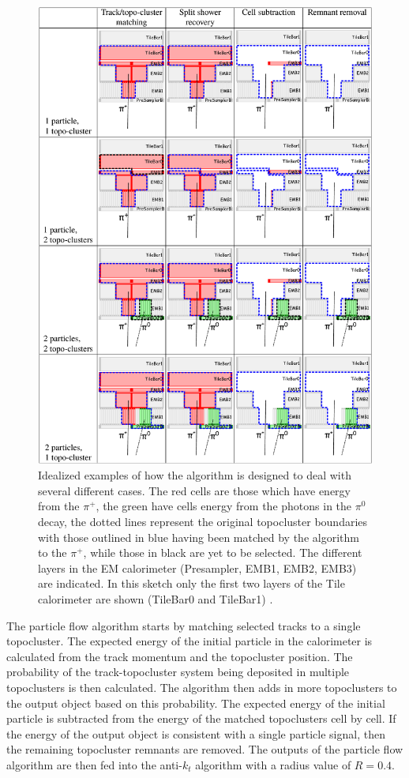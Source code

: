 		\begin{figure}[!ht]
		\centering
		\includegraphics[width=.75\textwidth,keepaspectratio=true]{chapters/chapter5_eventreconnstruction/images/pflow_example.png}
		\caption{\label{fig:pflow-example} Idealized examples of how the algorithm is designed to deal with several different cases. The red cells are those which have energy from the $\pi^{+}$, the green have cells energy from the photons in the $\pi^{0}$  decay, the dotted lines represent the original topocluster boundaries with those outlined in blue having been matched by the algorithm to the $\pi^{+}$, while those in black are yet to be selected. The different layers in the EM calorimeter (Presampler, EMB1, EMB2, EMB3) are indicated. In this sketch only the first two layers of the Tile calorimeter are shown (TileBar0 and TileBar1) \cite{pflow}.}
		\end{figure}

		The particle flow algorithm starts by matching selected tracks to a single topocluster. The expected energy of the initial particle in the calorimeter is calculated from the track momentum and the topocluster position. The probability of the track-topocluster system being deposited in multiple topoclusters is then calculated. The algorithm then adds in more topoclusters to the output object based on this probability. The expected energy of the initial particle is subtracted from the energy of the matched topoclusters cell by cell. If the energy of the output object is consistent with a single particle signal, then the remaining topocluster remnants are removed. The outputs of the particle flow algorithm are then fed into the anti-$k_t$ algorithm \cite{anti-kt} with a radius value of $R=0.4$. 


